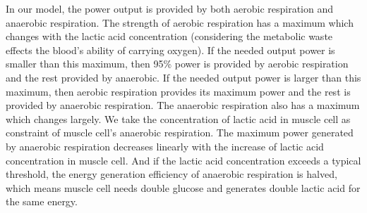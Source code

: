 \documentclass{mcmthesis}
\begin{document}
  In our model, the power output is provided by both aerobic respiration and anaerobic respiration. The strength of aerobic respiration has a maximum which changes with the lactic acid concentration (considering the metabolic waste effects the blood’s ability of carrying oxygen). If the needed output power is smaller than this maximum, then 95\% power is provided by aerobic respiration and the rest provided by anaerobic. If the needed output power is larger than this maximum, then aerobic respiration provides its maximum power and the rest is provided by anaerobic respiration. The anaerobic respiration also has a maximum which changes largely. We take the concentration of lactic acid in muscle cell as constraint of muscle cell’s anaerobic respiration. The maximum power generated by anaerobic respiration decreases linearly with the increase of lactic acid concentration in muscle cell. And if the lactic acid concentration exceeds a typical threshold, the energy generation efficiency of anaerobic respiration is halved, which means muscle cell needs double glucose and generates double lactic acid for the same energy.\\
\end{document}

